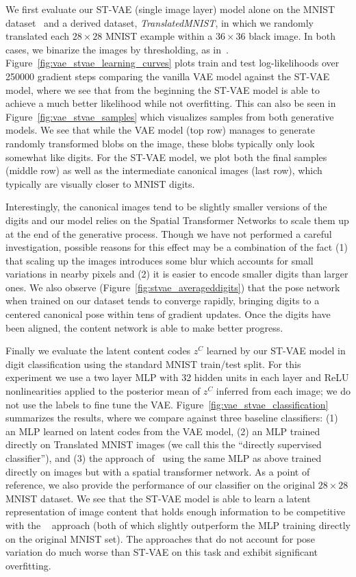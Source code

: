  We first evaluate our ST-VAE (single image layer) model alone on the MNIST dataset~\citep{lecun1998gradient}
and a derived dataset, \emph{TranslatedMNIST}, in which we randomly translated each  $28\times 28$ MNIST example
within a $36\times 36$ black image.  In both cases, we binarize the
images by thresholding,
as in~\cite{Kingma2014}.
Figure~\ref{fig:vae_stvae_learning_curves} plots train and test log-likelihoods over 250000 gradient steps
comparing the vanilla VAE model against the ST-VAE model, where we see that from the beginning the ST-VAE
model is able to achieve a much better likelihood while not overfitting.  This can also be seen in Figure~\ref{fig:vae_stvae_samples}
which visualizes samples from both generative models.   We see that while the VAE model (top row) manages to 
generate randomly transformed blobs on the image, these blobs typically only look somewhat like digits. 
For the ST-VAE model, we plot both the final samples (middle row) as well as the intermediate canonical images (last row), 
which typically are visually closer to MNIST digits. 

Interestingly, the canonical images tend to be slightly smaller versions
of the digits and our model relies on the Spatial Transformer Networks to scale them up at the end of the generative process.
Though we have not performed a careful investigation, 
possible reasons for this effect may be a combination of the fact (1) that scaling up the images introduces some blur which accounts for small variations in  nearby pixels and (2) it  is easier to encode smaller digits than larger ones.
 We also observe (Figure~\ref{fig:stvae_averageddigits})
that the pose network when trained on our dataset tends to converge rapidly, bringing digits to a centered canonical pose
within tens of gradient updates. 
Once the digits have been aligned, the content network is able to make better progress.

Finally we evaluate the latent content codes $z^C$ learned by our ST-VAE model 
in digit classification using the standard MNIST train/test split.  For this experiment
we use a two layer MLP with 32 hidden units in each layer and
ReLU nonlinearities
applied to the posterior mean of $z^C$ inferred from each image; we
do not use the labels to fine tune the VAE.
Figure~\ref{fig:vae_stvae_classification} summarizes the results, where we
compare against three baseline classifiers: (1) an MLP learned on latent codes from the VAE model,
(2) an MLP trained directly on Translated MNIST images (we call this the ``directly supervised classifier''), 
and (3) the approach of~\cite{jaderberg2015spatial} using the same MLP as above trained directly
on images but with a spatial transformer network.
As a point of reference, we also provide the performance of our classifier on the original $28\times 28$ MNIST
dataset.  We see that the ST-VAE model is able to learn a latent representation of image content that holds enough information
to be competitive with the ~\cite{jaderberg2015spatial} approach (both of which slightly outperform 
the MLP training directly on the original MNIST set).  The approaches that do not account for
pose variation do much worse than ST-VAE on this task and exhibit significant overfitting.

